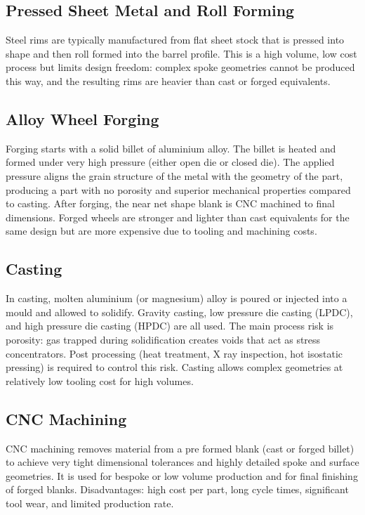 \documentclass[10pt,a4paper]{article}
\begin{document}
\subsection{Pressed Sheet Metal and Roll Forming}

Steel rims are typically manufactured from flat sheet stock that is pressed into shape and then roll formed into the barrel profile. This is a high volume, low cost process but limits design freedom: complex spoke geometries cannot be produced this way, and the resulting rims are heavier than cast or forged equivalents.

\subsection{Alloy Wheel Forging}

Forging starts with a solid billet of aluminium alloy. The billet is heated and formed under very high pressure (either open die or closed die). The applied pressure aligns the grain structure of the metal with the geometry of the part, producing a part with no porosity and superior mechanical properties compared to casting. After forging, the near net shape blank is CNC machined to final dimensions. Forged wheels are stronger and lighter than cast equivalents for the same design but are more expensive due to tooling and machining costs.

\subsection{Casting}

In casting, molten aluminium (or magnesium) alloy is poured or injected into a mould and allowed to solidify. Gravity casting, low pressure die casting (LPDC), and high pressure die casting (HPDC) are all used. The main process risk is porosity: gas trapped during solidification creates voids that act as stress concentrators. Post processing (heat treatment, X ray inspection, hot isostatic pressing) is required to control this risk. Casting allows complex geometries at relatively low tooling cost for high volumes.

\subsection{CNC Machining}

CNC machining removes material from a pre formed blank (cast or forged billet) to achieve very tight dimensional tolerances and highly detailed spoke and surface geometries. It is used for bespoke or low volume production and for final finishing of forged blanks. Disadvantages: high cost per part, long cycle times, significant tool wear, and limited production rate.
\end{document}
